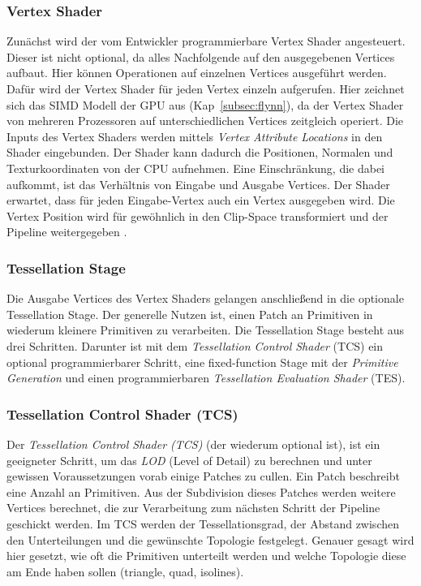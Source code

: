 \subsubsection{Vertex Shader}
\label{subsubsec:vertex}
Zunächst wird der vom Entwickler programmierbare Vertex Shader angesteuert.
Dieser ist nicht optional, da alles Nachfolgende auf den ausgegebenen Vertices aufbaut.
Hier können Operationen auf einzelnen Vertices ausgeführt werden.
Dafür wird der Vertex Shader für jeden Vertex einzeln aufgerufen.
Hier zeichnet sich das SIMD Modell der GPU aus (Kap~\ref{subsec:flynn}), da der Vertex Shader von mehreren Prozessoren auf unterschiedlichen Vertices zeitgleich operiert.
Die Inputs des Vertex Shaders werden mittels \textit{Vertex Attribute Locations} in den Shader eingebunden.
Der Shader kann dadurch die Positionen, Normalen und Texturkoordinaten von der CPU aufnehmen.
Eine Einschränkung, die dabei aufkommt, ist das Verhältnis von Eingabe und Ausgabe Vertices.
Der Shader erwartet, dass für jeden Eingabe-Vertex auch ein Vertex ausgegeben wird.
Die Vertex Position wird für gewöhnlich in den Clip-Space transformiert und der Pipeline weitergegeben \cite{Maughan2001}.

\subsubsection{Tessellation Stage}
\label{subsubsec:tesselation}
Die Ausgabe Vertices des Vertex Shaders gelangen anschließend in die optionale Tessellation Stage.
Der generelle Nutzen ist, einen Patch an Primitiven in wiederum kleinere Primitiven zu verarbeiten. 
Die Tessellation Stage besteht aus drei Schritten.
Darunter ist mit dem \textit{Tessellation Control Shader} (TCS) ein optional programmierbarer Schritt, eine fixed-function Stage mit der \textit{Primitive Generation} und einen programmierbaren \textit{Tessellation Evaluation Shader} (TES).

\subsubsection*{Tessellation Control Shader (TCS)}
Der \textit{Tessellation Control Shader (TCS)} (der wiederum optional ist), ist ein geeigneter Schritt, um das \textit{LOD} (Level of Detail) zu berechnen und unter gewissen Voraussetzungen vorab einige Patches zu cullen. 
Ein Patch beschreibt eine Anzahl an Primitiven.
Aus der Subdivision dieses Patches werden weitere Vertices berechnet, die zur Verarbeitung zum nächsten Schritt der Pipeline geschickt werden.
Im TCS werden der Tessellationsgrad, der Abstand zwischen den Unterteilungen und die gewünschte Topologie festgelegt.
Genauer gesagt wird hier gesetzt, wie oft die Primitiven unterteilt werden und welche Topologie diese am Ende haben sollen (triangle, quad, isolines).

